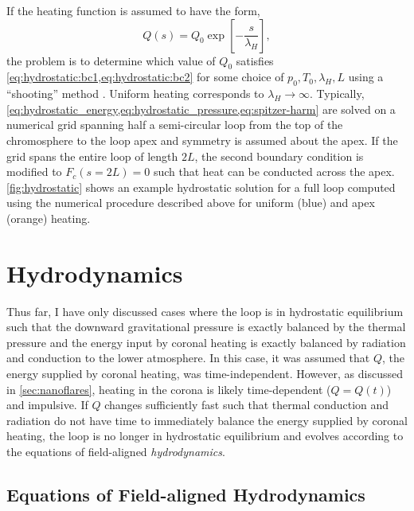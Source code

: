 If the heating function is assumed to have the form,
\begin{equation*}
    Q(s) = Q_0\exp{\left[-\frac{s}{\lambda_H}\right]},
\end{equation*}
the problem is to determine which value of $Q_0$ satisfies \cref{eq:hydrostatic:bc1,eq:hydrostatic:bc2} for some choice of $p_0,T_0,\lambda_H,L$ using a ``shooting'' method \citep[see Section 17.1 of][]{press_numerical_1992}. Uniform heating corresponds to $\lambda_H\to\infty$. Typically, \cref{eq:hydrostatic_energy,eq:hydrostatic_pressure,eq:spitzer-harm} are solved on a numerical grid spanning half a semi-circular loop from the top of the chromosphere to the loop apex and symmetry is assumed about the apex. If the grid spans the entire loop of length $2L$, the second boundary condition is modified to $F_c(s=2L)=0$ such that heat can be conducted across the apex. \autoref{fig:hydrostatic} shows an example hydrostatic solution for a full loop computed using the numerical procedure described above for uniform (blue) and apex (orange) heating.

\section{Hydrodynamics}\label{sec:hydrodynamics}

Thus far, I have only discussed cases where the loop is in hydrostatic equilibrium such that the downward gravitational pressure is exactly balanced by the thermal pressure and the energy input by coronal heating is exactly balanced by radiation and conduction to the lower atmosphere. In this case, it was assumed that $Q$, the energy supplied by coronal heating, was time-independent. However, as discussed in \autoref{sec:nanoflares}, heating in the corona is likely time-dependent ($Q=Q(t)$) and impulsive. If $Q$ changes sufficiently fast such that thermal conduction and radiation do not have time to immediately balance the energy supplied by coronal heating, the loop is no longer in hydrostatic equilibrium and evolves according to the equations of field-aligned \textit{hydrodynamics}.

\subsection{Equations of Field-aligned Hydrodynamics}\label{sec:hydrodynamic-equations}

